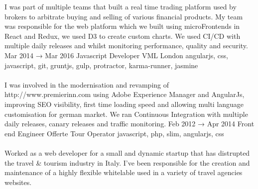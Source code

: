 \documentclass[9pt]{stackoverflow} %
\begin{document}
\begin{tcolorbox}
{\begin{entrylist}
{		I was part of multiple teams that built a real time trading platform used by brokers to arbitrate buying and selling of various financial products.
My team was responsible for the web platform which we built using microFrontends in React and Redux, we used D3 to create custom charts. We used CI/CD with multiple daily releases and whilst monitoring performance, quality and security.}
	\entry
		{Mar 2014 → Mar 2016}
		{Javascript Developer}
		{VML London}
		{{angularjs, css, javascript, git, gruntjs, gulp, protractor, karma-runner, jasmine}\\\\
		I was involved in the modernisation and revamping of http://www.premierinn.com using Adobe Experience Manager and AngularJs, improving SEO visibility, first time loading speed and allowing multi language customisation for german market.
		We ran Continuous Integration with multiple daily releases, canary releases and traffic monitoring.}
	\entry
		{Feb 2012 → Apr 2014}
		{Front end Engineer}
		{Offerte Tour Operator}
		{{javascript, php, slim, angularjs, css}\\\\
		Worked as a web developer for a small and dynamic startup that has distrupted the travel \& tourism industry in Italy. I've been responsible for the creation and maintenance of a highly flexible whitelable used in a variety of travel agencies websites.}
	\end{entrylist}}
\end{tcolorbox}

\end{document}
